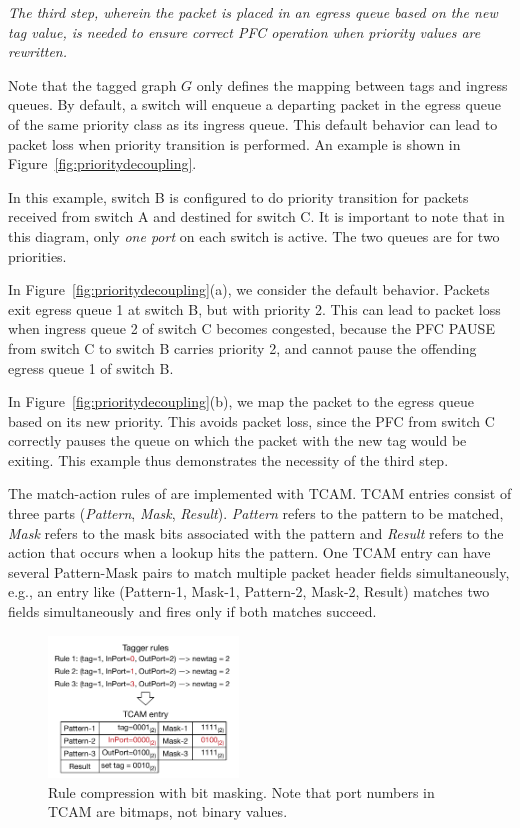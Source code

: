 {\em The third step, wherein the packet is placed in an egress queue based on the
{\em new} tag value, is needed to ensure correct PFC operation when priority
values are rewritten.}

Note that the tagged graph $G$ only defines the mapping between tags and ingress
queues. By default, a switch will enqueue a departing packet in the egress queue
of the same priority class as its ingress queue. This default behavior can lead
to packet loss when priority transition is performed. An example is shown in
Figure~\ref{fig:prioritydecoupling}.

In this example, switch B is configured to do priority transition for packets
received from switch A and destined for switch C. It is important to note that
in this diagram, only {\em one port} on each switch is active. The two queues
are for two priorities.

In Figure~\ref{fig:prioritydecoupling}(a), we consider the default behavior.
Packets exit egress queue 1 at switch B, but with priority 2.  This can lead
to packet loss when ingress queue 2 of switch C becomes congested, because
the PFC PAUSE from switch C to switch B carries priority 2, and cannot pause
the offending egress queue 1 of switch B.

In Figure~\ref{fig:prioritydecoupling}(b), we map the packet to the egress queue
based on its new priority.  This avoids packet loss, since the PFC from switch C
correctly pauses the queue on which the packet with the new tag would be
exiting. This example thus demonstrates the necessity of the third step.

  The match-action rules of \sysname{}
are implemented with TCAM. TCAM entries consist of three parts ({\em Pattern},
{\em Mask}, {\em Result}). {\em Pattern} refers to the pattern to be matched, {\em
Mask} refers to the mask bits associated with the pattern and {\em Result}
refers to the action that occurs when a lookup hits the pattern.  One TCAM entry
can have several Pattern-Mask pairs to match multiple packet header fields
simultaneously, e.g., an entry like (Pattern-1, Mask-1, Pattern-2, Mask-2, Result)
matches two fields simultaneously and fires only if both matches succeed.

\begin{figure}
	\centering
	\includegraphics[width=0.45\textwidth] {figs/compression_with_bitmasking}
	\vspace{-1em}
	\caption{Rule compression with bit masking. Note that port numbers in TCAM are bitmaps, not binary values.}\label{fig:compression}
    \vspace{-1em}	
\end{figure}

